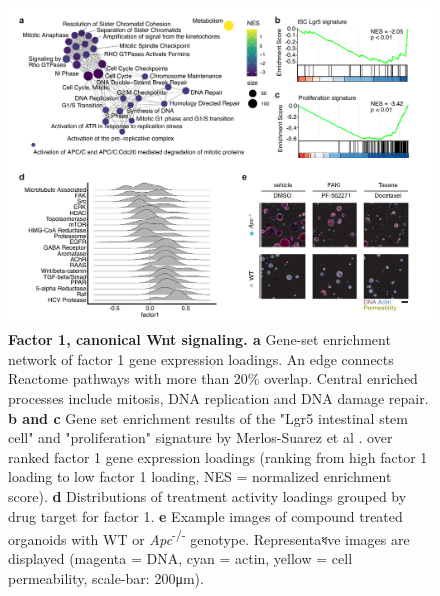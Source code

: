 \begin{flushleft}
\begin{figure}[h!]
\centering
\includegraphics[width=\textwidth,
                height=\textheight,
                keepaspectratio]{figures/adenomaprofiling/pdf/fig_2_1.pdf}
\caption[Factor 1, canonical Wnt signaling]{\textbf{Factor 1, canonical Wnt signaling. a} Gene-set enrichment network of factor 1 gene expression loadings. An edge connects Reactome pathways with more than 20\% overlap. Central enriched processes include mitosis, DNA replication and DNA damage repair. \textbf{b and c} Gene set enrichment results of the "Lgr5 intestinal stem cell" and "proliferation" signature by Merlos-Suarez et al \citep{merlos-suarezIntestinalStemCell2011}. over ranked factor 1 gene expression loadings (ranking from high factor 1 loading to low factor 1 loading, NES = normalized enrichment score). \textbf{d} Distributions of treatment activity loadings grouped by drug target for factor 1. \textbf{e} Example images of compound treated organoids with WT or \textit{Apc}\textsuperscript{-/-}  genotype. Representaধve images are displayed (magenta = DNA, cyan = actin, yellow = cell permeability, scale-bar: 200μm).}
\label{fig_190}
\end{figure}
\bigbreak


\end{flushleft}
